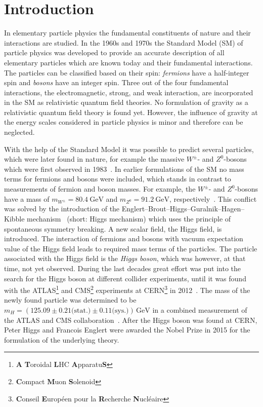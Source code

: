 \chapter{Introduction}\label{cha:introduction}

In elementary particle physics the fundamental constituents of nature and their interactions are studied.
In the 1960s and 1970s the Standard Model (SM) of particle physics was developed to provide an accurate description of all elementary particles which are known today
and their fundamental interactions.
The particles can be classified based on their spin: \emph{fermions} have a half-integer spin and \emph{bosons} have an integer spin.
Three out of the four fundamental interactions, the electromagnetic, strong, and weak interaction, are incorporated in the SM as
relativistic quantum field theories.
No formulation of gravity as a relativistic quantum field theory is found yet.
However, the influence of gravity at the energy scales considered in particle physics is minor and therefore can be neglected.

With the help of the Standard Model it was possible to predict several particles, which were later found in nature,
for example the massive $W^\pm$- and $Z^0$-bosons which were first observed in 1983~\cite{ZDiscovery,WDiscovery,ZeeDiscovery,WeDiscovery}.
In earlier formulations of the SM no mass terms for fermions and bosons were included, which stands in contrast to measurements of fermion and boson masses.
For example, the $W^\pm$- and $Z^0$-bosons have a mass of $m_{W^\pm} = \SI{80.4}{\GeV}$ and $m_{Z^0} = \SI{91.2}{\GeV}$, respectively~\cite{PDG}.
This conflict was solved by the introduction of the
Englert--Brout--Higgs--Guralnik--Hagen--Kibble mechanism~\cite{HiggsMecha1,HiggsMecha2,HiggsMecha3,HiggsMecha4,HiggsMecha5,HiggsMecha6} (short: Higgs mechanism)
which uses the principle of spontaneous symmetry breaking.
A new scalar field, the Higgs field, is introduced.
The interaction of fermions and bosons with vacuum expectation value of the Higgs field leads to required mass terms of the particles.
The particle associated with the Higgs field is the \emph{Higgs boson}, which was however, at that time, not yet observed.
During the last decades great effort was put into the search for the Higgs boson at different collider experiments, until it
was found with the ATLAS\footnote{\textbf{A} \textbf{T}oroidal \textbf{L}HC \textbf{A}pparatu\textbf{S}} and
CMS\footnote{\textbf{C}ompact \textbf{M}uon \textbf{S}olenoid} experiments at
CERN\footnote{\textbf{C}onseil \textbf{E}uropéen pour la \textbf{R}echerche \textbf{N}ucléaire} in 2012~\cite{HiggsDiscoveryATLAS,HiggsDiscoveryCMS}.
The mass of the newly found particle was determined to be $m_H = (125.09 \pm 0.21 \text{(stat.)} \pm 0.11 \text{(sys.)})\,\text{GeV}$
in a combined measurement of the ATLAS and CMS collaboration~\cite{MassCombinedMeas}.
After the Higgs boson was found at CERN, Peter Higgs and Francois Englert were awarded the Nobel Prize in 2015 for the formulation of
the underlying theory.

